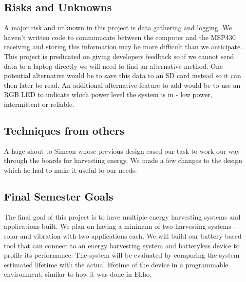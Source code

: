 \subsection{Risks and Unknowns}
A major risk and unknown in this project is data gathering and logging.
We haven't written code to communicate between the computer and the MSP430 receiving and storing this information may be more difficult than we anticipate.
This project is predicated on giving developers feedback so if we cannot send data to a laptop directly we will need to find an alternative method.
One potential alternative would be to save this data to an SD card instead so it can then later be read.
An additional alternative feature to add would be to use an RGB LED to indicate which power level the system is in - low power, intermittent or reliable.

\subsection{Techniques from others}

A huge shout to Simeon whose previous design eased our task to work our way through the boards for harvesting energy.
We made a few changes to the design which he had to make it useful to our needs.

\subsection{Final Semester Goals}
The final goal of this project is to have multiple energy harvesting systems and applications built.
We plan on having a minimum of two harvesting systems - solar and vibration with two applications each.
We will build our battery based tool that can connect to an energy harvesting system and batteryless device to profile its performance.
The system will be evaluated by comparing the system estimated lifetime with the actual lifetime of the device in a programmable environment, similar to how it was done in Ekho.
